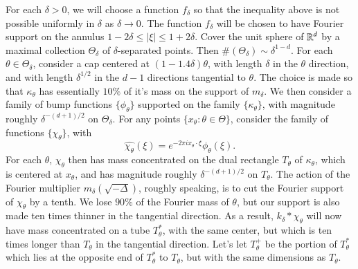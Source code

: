 For each $\delta > 0$, we will choose a function $f_\delta$ so that the inequality above is not possible uniformly in $\delta$ as $\delta \to 0$. The function $f_\delta$ will be chosen to have Fourier support on the annulus $1 - 2 \delta \leq |\xi| \leq 1 + 2 \delta$. Cover the unit sphere of $\operatorname{\mathbb{R}}^d$ by a maximal collection $\Theta_\delta$ of $\delta$-separated points. Then $\#(\Theta_\delta) \sim \delta^{1-d}$. For each $\theta \in \Theta_\delta$, consider a cap centered at $(1 - 1.4\delta) \theta$, with length $\delta$ in the $\theta$ direction, and with length $\delta^{1/2}$ in the $d-1$ directions tangential to $\theta$. The choice is made so that $\kappa_\theta$ has essentially $10\%$ of it's mass on the support of $m_\delta$. We then consider a family of bump functions $\{ \phi_\theta \}$ supported on the family $\{ \kappa_\theta \}$, with magnitude roughly $\delta^{-(d+1)/2}$ on $\Theta_\delta$. For any points $\{ x_\theta : \theta \in \Theta \}$, consider the family of functions $\{ \chi_\theta \}$, with
%
\[ \widehat{\chi_\theta}(\xi) = e^{- 2 \pi i x_\theta \cdot \xi} \phi_\theta(\xi). \]
%
For each $\theta$, $\chi_\theta$ then has mass concentrated on the dual rectangle $T_\theta$ of $\kappa_\theta$, which is centered at $x_\theta$, and has magnitude roughly $\delta^{-(d+1)/2}$ on $T_\theta$. The action of the Fourier multiplier $m_\delta(\sqrt{-\Delta})$, roughly speaking, is to cut the Fourier support of $\chi_\theta$ by a tenth. We lose $90 \%$ of the Fourier mass of $\theta$, but our support is also made ten times thinner in the tangential direction. As a result, $k_\delta * \chi_\theta$ will now have mass concentrated on a tube $T_\theta^*$, with the same center, but which is ten times longer than $T_\theta$ in the tangential direction. Let's let $T_\theta^+$ be the portion of $T_\theta^*$ which lies at the opposite end of $T_\theta^*$ to $T_\theta$, but with the same dimensions as $T_\theta$.

